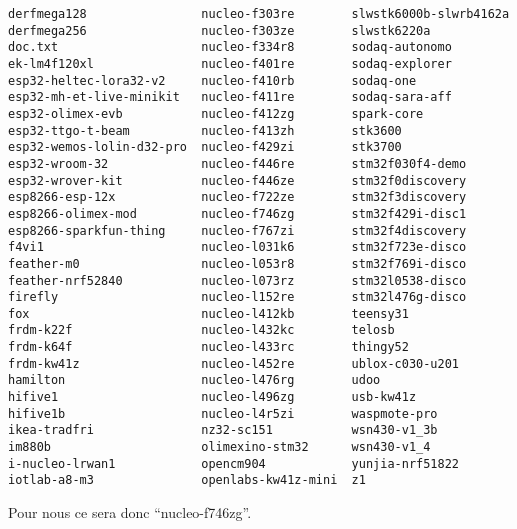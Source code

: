 {\begin{verbatim}
derfmega128                nucleo-f303re        slwstk6000b-slwrb4162a
derfmega256                nucleo-f303ze        slwstk6220a
doc.txt                    nucleo-f334r8        sodaq-autonomo
ek-lm4f120xl               nucleo-f401re        sodaq-explorer
esp32-heltec-lora32-v2     nucleo-f410rb        sodaq-one
esp32-mh-et-live-minikit   nucleo-f411re        sodaq-sara-aff
esp32-olimex-evb           nucleo-f412zg        spark-core
esp32-ttgo-t-beam          nucleo-f413zh        stk3600
esp32-wemos-lolin-d32-pro  nucleo-f429zi        stk3700
esp32-wroom-32             nucleo-f446re        stm32f030f4-demo
esp32-wrover-kit           nucleo-f446ze        stm32f0discovery
esp8266-esp-12x            nucleo-f722ze        stm32f3discovery
esp8266-olimex-mod         nucleo-f746zg        stm32f429i-disc1
esp8266-sparkfun-thing     nucleo-f767zi        stm32f4discovery
f4vi1                      nucleo-l031k6        stm32f723e-disco
feather-m0                 nucleo-l053r8        stm32f769i-disco
feather-nrf52840           nucleo-l073rz        stm32l0538-disco
firefly                    nucleo-l152re        stm32l476g-disco
fox                        nucleo-l412kb        teensy31
frdm-k22f                  nucleo-l432kc        telosb
frdm-k64f                  nucleo-l433rc        thingy52
frdm-kw41z                 nucleo-l452re        ublox-c030-u201
hamilton                   nucleo-l476rg        udoo
hifive1                    nucleo-l496zg        usb-kw41z
hifive1b                   nucleo-l4r5zi        waspmote-pro
ikea-tradfri               nz32-sc151           wsn430-v1_3b
im880b                     olimexino-stm32      wsn430-v1_4
i-nucleo-lrwan1            opencm904            yunjia-nrf51822
iotlab-a8-m3               openlabs-kw41z-mini  z1
\end{verbatim}
}
Pour nous ce sera donc \enquote{nucleo-f746zg}.\\

